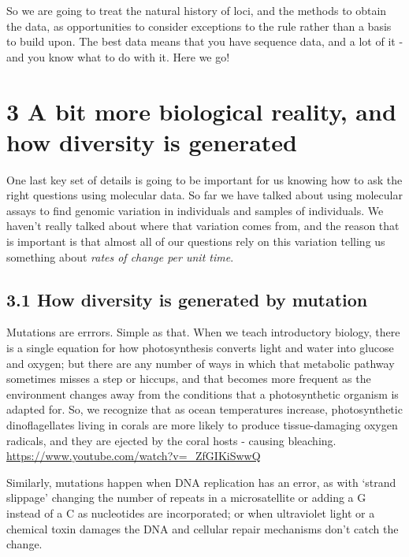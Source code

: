 \documentclass[
]{article}
\begin{document}
So we are going to treat the natural history of loci, and the methods to
obtain the data, as opportunities to consider exceptions to the rule
rather than a basis to build upon. The best data means that you have
sequence data, and a lot of it - and you know what to do with it. Here
we go!

\hypertarget{a-bit-more-biological-reality-and-how-diversity-is-generated}{%
\section{3 A bit more biological reality, and how diversity is
generated}\label{a-bit-more-biological-reality-and-how-diversity-is-generated}}

One last key set of details is going to be important for us knowing how
to ask the right questions using molecular data. So far we have talked
about using molecular assays to find genomic variation in individuals
and samples of individuals. We haven't really talked about where that
variation comes from, and the reason that is important is that almost
all of our questions rely on this variation telling us something about
\emph{rates of change per unit time}.

\hypertarget{how-diversity-is-generated-by-mutation}{%
\subsection{3.1 How diversity is generated by
mutation}\label{how-diversity-is-generated-by-mutation}}

Mutations are errrors. Simple as that. When we teach introductory
biology, there is a single equation for how photosynthesis converts
light and water into glucose and oxygen; but there are any number of
ways in which that metabolic pathway sometimes misses a step or hiccups,
and that becomes more frequent as the environment changes away from the
conditions that a photosynthetic organism is adapted for. So, we
recognize that as ocean temperatures increase, photosynthetic
dinoflagellates living in corals are more likely to produce
tissue-damaging oxygen radicals, and they are ejected by the coral hosts
- causing bleaching. \url{https://www.youtube.com/watch?v=_ZfGIKiSwwQ}

Similarly, mutations happen when DNA replication has an error, as with
`strand slippage' changing the number of repeats in a microsatellite or
adding a G instead of a C as nucleotides are incorporated; or when
ultraviolet light or a chemical toxin damages the DNA and cellular
repair mechanisms don't catch the change.
\end{document}
